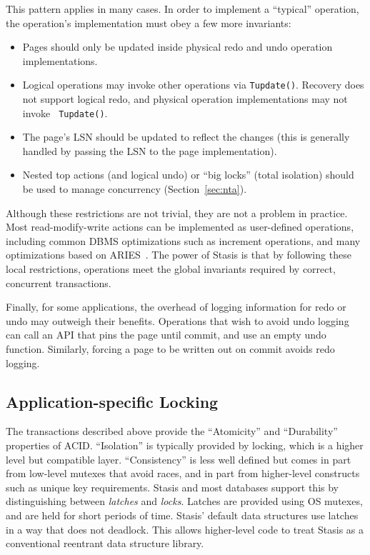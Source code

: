 \documentclass[letterpaper,twocolumn,10pt]{article}
\newcommand{\yad}{Stasis\xspace}
\newcommand{\yads}{Stasis'\xspace}
\begin{document}
This pattern applies in many cases.  In
order to implement a ``typical'' operation, the operation's
implementation must obey a few more invariants:
\begin{itemize}
\item Pages should only be updated inside physical redo and undo operation implementations.
\item Logical operations may invoke other operations
      via {\tt Tupdate()}.  Recovery does not support logical redo,
      and physical operation implementations may not invoke {\tt
      Tupdate()}.
\item The page's LSN should be updated to reflect the changes (this is
      generally handled by passing the LSN to the page implementation).

\item Nested top actions (and logical undo) or ``big locks'' (total isolation) should be used to manage concurrency (Section~\ref{sec:nta}).
\end{itemize}

Although these restrictions are not trivial, they are not a problem in
practice. Most read-modify-write actions can be implemented as
user-defined operations, including common DBMS optimizations such as
increment operations, and many optimizations based on 
ARIES~\cite{stableHeap, ariesIM}.  The power of \yad is that by following these
local restrictions, operations meet the global
invariants required by correct, concurrent transactions.

Finally, for some applications, the overhead of logging information for redo or
undo may outweigh their benefits.  Operations that wish to avoid undo
logging can call an API that pins the page until commit, and use an
empty undo function.  Similarly, forcing a page
to be written out on commit avoids redo logging.

\subsection{Application-specific Locking}
\label{sec:locking}
The transactions described above provide the
``Atomicity'' and ``Durability'' properties of ACID.
  ``Isolation'' is
typically provided by locking, which is a higher level but
compatible layer.  ``Consistency'' is less well defined but comes in
part from low-level mutexes that avoid races, and in part from
higher-level constructs such as unique key requirements.  \yad and most databases support this by distinguishing between {\em latches} and {\em locks}.
Latches are provided using OS mutexes, and are held for
short periods of time.  \yads default data structures use latches in a
way that does not deadlock.  This allows higher-level code to treat 
\yad as a conventional reentrant data structure library.  
\end{document}
